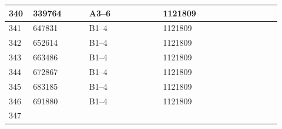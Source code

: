 \documentclass[UTF8,10pt,a4paper,fontset=fandol]{ctexart}
\newcommand{\fieldvalue}[1]{#1}
\begin{document}
\begin{center}
\begin{tabular}{|p{0.08\linewidth}|p{0.19\linewidth}|p{0.25\linewidth}|p{0.25\linewidth}|p{0.15\linewidth}|}
\fieldvalue{340} &
\fieldvalue{339764} &
\fieldvalue{A3--6} &
\fieldvalue{1121809} & \\ \hline
\fieldvalue{341} &
\fieldvalue{647831} &
\fieldvalue{B1--4} &
\fieldvalue{1121809} & \\ \hline
\fieldvalue{342} &
\fieldvalue{652614} &
\fieldvalue{B1--4} &
\fieldvalue{1121809} & \\ \hline
\fieldvalue{343} &
\fieldvalue{663486} &
\fieldvalue{B1--4} &
\fieldvalue{1121809} & \\ \hline
\fieldvalue{344} &
\fieldvalue{672867} &
\fieldvalue{B1--4} &
\fieldvalue{1121809} & \\ \hline
\fieldvalue{345} &
\fieldvalue{683185} &
\fieldvalue{B1--4} &
\fieldvalue{1121809} & \\ \hline
\fieldvalue{346} &
\fieldvalue{691880} &
\fieldvalue{B1--4} &
\fieldvalue{1121809} & \\ \hline
\fieldvalue{347} &

\end{tabular}
\end{center}
\end{document}
